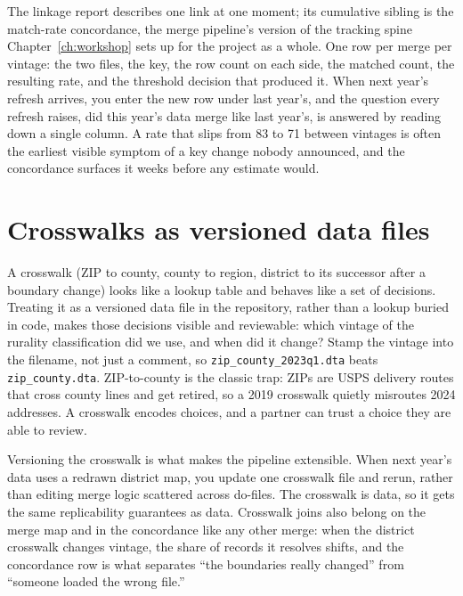 The linkage report describes one link at one moment; its cumulative sibling is the match-rate concordance, the merge pipeline's version of the tracking spine Chapter~\ref{ch:workshop} sets up for the project as a whole. One row per merge per vintage: the two files, the key, the row count on each side, the matched count, the resulting rate, and the threshold decision that produced it. When next year's refresh arrives, you enter the new row under last year's, and the question every refresh raises, did this year's data merge like last year's, is answered by reading down a single column. A rate that slips from 83 to 71 between vintages is often the earliest visible symptom of a key change nobody announced, and the concordance surfaces it weeks before any estimate would.

\section{Crosswalks as versioned data files}
A crosswalk (ZIP to county, county to region, district to its successor after a boundary change) looks like a lookup table and behaves like a set of decisions. Treating it as a versioned data file in the repository, rather than a lookup buried in code, makes those decisions visible and reviewable: which vintage of the rurality classification did we use, and when did it change? Stamp the vintage into the filename, not just a comment, so \texttt{zip\_county\_2023q1.dta} beats \texttt{zip\_county.dta}. ZIP-to-county is the classic trap: ZIPs are USPS delivery routes that cross county lines and get retired, so a 2019 crosswalk quietly misroutes 2024 addresses. A crosswalk encodes choices, and a partner can trust a choice they are able to review.

Versioning the crosswalk is what makes the pipeline extensible. When next year's data uses a redrawn district map, you update one crosswalk file and rerun, rather than editing merge logic scattered across do-files. The crosswalk is data, so it gets the same replicability guarantees as data. Crosswalk joins also belong on the merge map and in the concordance like any other merge: when the district crosswalk changes vintage, the share of records it resolves shifts, and the concordance row is what separates \enquote{the boundaries really changed} from \enquote{someone loaded the wrong file.}

